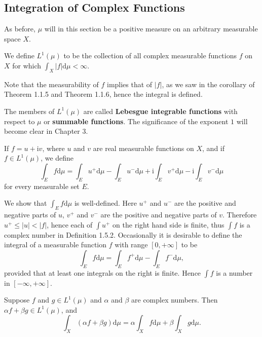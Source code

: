 \subsection{Integration of Complex Functions}
As before, $\mu$ will in this section be a positive measure on an arbitrary measurable space $X$.
\begin{definition}
We define $L^1(\mu)$ to be the collection of all complex measurable functions $f$ on $X$ for which $\int_X|f|\mathrm{d}\mu<\infty$.
\end{definition}
Note that the measurability of $f$ implies that of $|f|$, as we saw in the corollary of Theorem 1.1.5 and Theorem 1.1.6, hence the integral is defined.\par
The members of $L^1(\mu)$ are called \textbf{Lebesgue integrable functions} with respect to $\mu$ or \textbf{summable functions}. The significance of the exponent $1$ will become clear in Chapter 3.
\begin{definition}
If $f=u+\mathrm{i}v$, where $u$ and $v$ are real measurable functions on $X$, and if $f\in L^1(\mu)$, we define 
$$
\int_E{f\mathrm{d}\mu}=\int_E{u^+\mathrm{d}\mu}-\int_E{u^-\mathrm{d}\mu}+\mathrm{i}\int_E{v^+\mathrm{d}\mu}-\mathrm{i}\int_E{v^-\mathrm{d}\mu}
$$
for every measurable set $E$.
\end{definition}
We show that $\int_Ef\mathrm{d}\mu$ is well-defined. Here $u^+$ and $u^-$ are the positive and negative parts of $u$, $v^+$ and $v^-$ are the positive and negative parts of $v$. Therefore $u^+\le|u|<|f|$, hence each of $\int u^+$ on the right hand side is finite, thus $\int f$ is a complex number in Definition 1.5.2. Occasionally it is desirable to define the integral of a measurable function $f$ with range $[0,+\infty]$ to be 
$$\int_Ef\mathrm{d}\mu=\int_Ef^+\mathrm{d}\mu-\int_Ef^-\mathrm{d}\mu,$$
provided that at least one integrals on the right is finite. Hence $\int f$ is a number in $[-\infty,+\infty]$.
\begin{theorem}
Suppose $f$ and $g\in L^1(\mu)$ and $\alpha$ and $\beta$ are complex numbers. Then $\alpha f+\beta g\in L^1(\mu)$, and 
$$\int_X(\alpha f+\beta g)\mathrm{d}\mu=\alpha\int_Xf\mathrm{d}\mu+\beta\int_Xg\mathrm{d}\mu.$$
\end{theorem}
